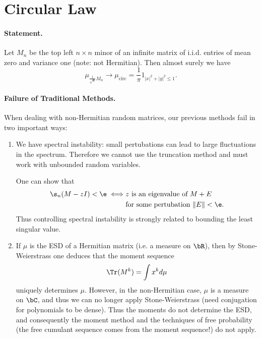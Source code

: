 \section{Circular Law}

\paragraph{Statement.} Let $M_n$ be the top left $n \times n$ minor of an infinite matrix of i.i.d. entries of mean zero and variance one (note: not Hermitian). Then almost surely we have
\[
    \mu_{\frac{1}{\sqrt{n}}M_n} \to \mu_{\text{circ}} = \frac{1}{\pi}1_{|x|^2+|y|^2 \le 1}.
\]

\paragraph{Failure of Traditional Methods.} When dealing with non-Hermitian random matrices, our previous methods fail in two important ways:
\begin{enumerate}
    \item We have spectral instability: small pertubations can lead to large fluctuations in the spectrum. Therefore we cannot use the truncation method and must work with unbounded random variables.

    One can show that
    \[
        \begin{split}
            \s_n(M-zI) < \e \iff & z \text{ is an eigenvalue of $M + E$} \\
                                 & \text{for some pertubation } \|E\| < \e.
        \end{split}
    \]
    Thus controlling spectral instability is strongly related to bounding the least singular value.
    \item If $\mu$ is the ESD of a Hermitian matrix (i.e. a measure on $\bR$), then by Stone-Weierstrass one deduces that the moment sequence
    \[
        \Tr(M^k) = \int x^k d\mu
    \]
    uniquely determines $\mu$. However, in the non-Hermitian case, $\mu$ is a measure on $\bC$, and thus we can no longer apply Stone-Weierstrass (need conjugation for polynomials to be dense). Thus the moments do not determine the ESD, and consequently the moment method and the techniques of free probability (the free cumulant sequence comes from the moment sequence!) do not apply.
\end{enumerate}

